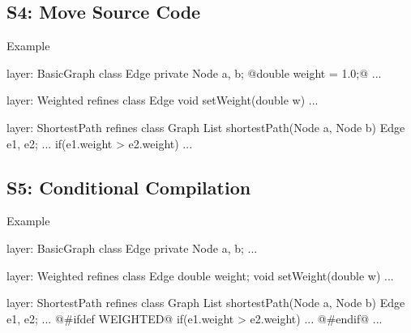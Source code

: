 \subsection{S4: Move Source Code}

\begin{frame}{\myframetitle}
\end{frame}

\begin{frame}[fragile]{Example}
	\begin{mycolumns}[widths={50,50},animation=none]
\begin{codetight}{layer: BasicGraph}
class Edge {
	private Node a, b;
	@double weight = 1.0;@
	...
}
\end{codetight}	
\begin{codetight}{layer: Weighted}
refines class Edge {
	void setWeight(double w){ ... }
}
\end{codetight}	
	\mynextcolumn
\begin{codetight}{layer: ShortestPath}
refines class Graph {
	List shortestPath(Node a, Node b){
		Edge e1, e2;
		...
		if(e1.weight > e2.weight) 
		... 
	}
}
\end{codetight}	
	\end{mycolumns}
\end{frame}

\subsection{S5: Conditional Compilation}

\begin{frame}{\myframetitle}
\end{frame}

\begin{frame}[fragile]{Example}
	\begin{mycolumns}[widths={50,50},animation=none]
\begin{codetight}{layer: BasicGraph}
class Edge {
	private Node a, b;
	...
}
\end{codetight}	
\begin{codetight}{layer: Weighted}
refines class Edge {
	double weight;
	void setWeight(double w){ ... }
}
\end{codetight}	
	\mynextcolumn
\begin{codetight}{layer: ShortestPath}
refines class Graph {
	List shortestPath(Node a, Node b){
		Edge e1, e2;
		...
@#ifdef WEIGHTED@		
		if(e1.weight > e2.weight) ...
@#endif@
		... 
	}
}
\end{codetight}	
	\end{mycolumns}
\end{frame}

